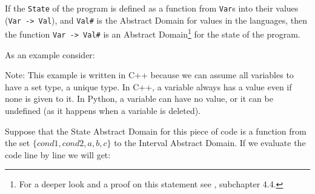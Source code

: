 If the \texttt{State} of the program is defined as a function from
\texttt{Var}s into their values (\texttt{Var\ -\textgreater{}\ Val}),
and \texttt{Val\#} is the Abstract Domain for values in the languages,
then the function \texttt{Var\ -\textgreater{}\ Val\#} is an Abstract
Domain\footnote{For a deeper look and a proof on this statement see
  \textcite{nielson2015principles}, subchapter 4.4.} for the state of
the program.

As an example consider:

\begin{Shaded}
\begin{Highlighting}[]

\NormalTok{  \} } 
\NormalTok{  \} }\NormalTok{ \{}
\NormalTok{  \}}
   \NormalTok{;}
\NormalTok{\}}
\end{Highlighting}
\end{Shaded}

Note: This example is written in C++ because we can assume all variables
to have a set type, a unique type. In C++, a variable always has a value
even if none is given to it. In Python, a variable can have no value, or
it can be undefined (as it happens when a variable is deleted).

Suppose that the State Abstract Domain for this piece of code is a
function from the set \(\{cond1, cond2, a, b, c\}\) to the Interval
Abstract Domain. If we evaluate the code line by line we will get:


